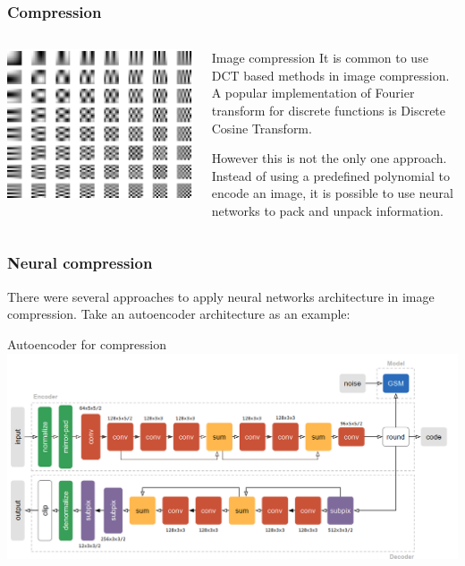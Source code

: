 \documentclass[10pt]{beamer}
\begin{document}
\begin{frame}
    \frametitle{Compression}
    \begin{columns}
        \begin{column}{0.5\textwidth}
            \includegraphics[width=\textwidth]{figure/2d-dct.png}
        \end{column}
        \begin{column}{0.5\textwidth}
            \begin{block}{Image compression}
                It is common to use DCT based methods in image compression. A popular implementation of Fourier transform for discrete functions is Discrete Cosine Transform.

                However this is not the only one approach. Instead of using a predefined polynomial to encode an image, it is possible to use neural networks to pack and unpack information.
            \end{block}
        \end{column}
    \end{columns}
\end{frame}

\begin{frame}
    \frametitle{Neural compression}
    There were several approaches to apply neural networks architecture in image compression. Take an autoencoder architecture as an example:
    \begin{block}{Autoencoder for compression}
        \includegraphics[width=\textwidth]{figure/neural-compression.png}
    \end{block}
\end{frame}
\end{document}
